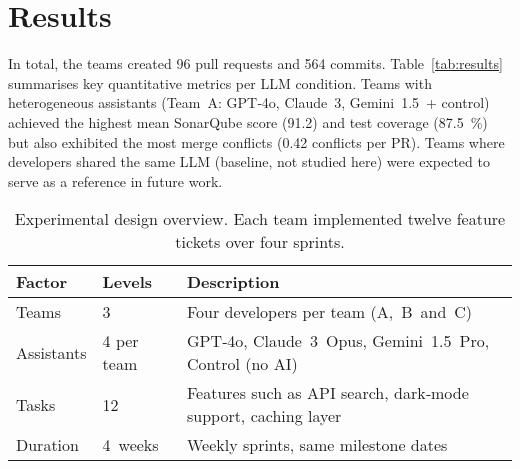 \documentclass[conference]{IEEEtran}
\begin{document}
\section{Results}
In total, the teams created 96 pull requests and 564 commits.  Table \ref{tab:results} summarises key quantitative metrics per LLM condition.  Teams with heterogeneous assistants (Team A: GPT‑4o, Claude 3, Gemini 1.5 + control) achieved the highest mean SonarQube score (91.2) and test coverage (87.5 \%) but also exhibited the most merge conflicts (0.42 conflicts per PR).  Teams where developers shared the same LLM (baseline, not studied here) were expected to serve as a reference in future work.

\smallskip


\begin{table}[t]
\centering
\caption{Experimental design overview.  Each team implemented twelve feature tickets over four sprints.}
\label{tab:design}
\begin{tabular}{p{2.5cm}p{2cm}p{3cm}}
\toprule
\textbf{Factor} & \textbf{Levels} & \textbf{Description}\\
\midrule
Teams & 3 & Four developers per team (A, B and C) \\
Assistants & 4 per team & GPT‑4o, Claude 3 Opus, Gemini 1.5 Pro, Control (no AI) \\
Tasks & 12 & Features such as API search, dark‑mode support, caching layer \\
Duration & 4 weeks & Weekly sprints, same milestone dates \\
\bottomrule
\end{tabular}
\end{table}
\end{document}
